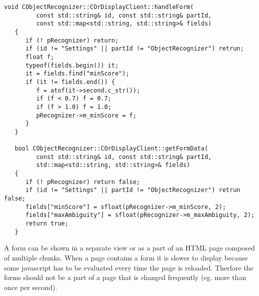 \begin{Verbatim}[fontsize=\scriptsize,gobble=3]
   void CObjectRecognizer::COrDisplayClient::handleForm(
         const std::string& id, const std::string& partId,
         const std::map<std::string, std::string>& fields)
   {
      if (! pRecognizer) return;
      if (id != "Settings" || partId != "ObjectRecognizer") retrun;
      float f;
      typeof(fields.begin()) it;
      it = fields.find("minScore");
      if (it != fields.end()) {
         f = atof(it->second.c_str());
         if (f < 0.7) f = 0.7;
         if (f > 1.0) f = 1.0;
         pRecognizer->m_minScore = f;
      }
   }

   bool CObjectRecognizer::COrDisplayClient::getFormData(
         const std::string& id, const std::string& partId,
         std::map<std::string, std::string>& fields)
   {
      if (! pRecognizer) return false;
      if (id != "Settings" || partId != "ObjectRecognizer") retrun false;
      fields["minScore"] = sfloat(pRecognizer->m_minScore, 2);
      fields["maxAmbiguity"] = sfloat(pRecognizer->m_maxAmbiguity, 2);
      return true;
   }
\end{Verbatim}

A form can be shown in a separate view or as a part of an HTML page composed of
multiple chunks. When a page contains a form it is slower to display because
some javascript has to be evaluated every time the page is reloaded. Therfore
the forms should not be a part of a page that is changed frequently (eg. more
than once per second).

